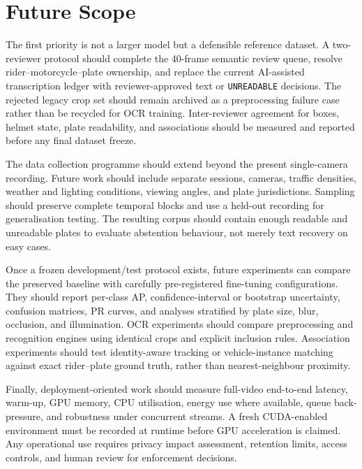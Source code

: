 \documentclass[journal]{IEEEtran}
\begin{document}
\section{Future Scope}
The first priority is not a larger model but a defensible reference dataset. A two-reviewer protocol should complete the 40-frame semantic review queue, resolve rider--motorcycle--plate ownership, and replace the current AI-assisted transcription ledger with reviewer-approved text or \texttt{UNREADABLE} decisions. The rejected legacy crop set should remain archived as a preprocessing failure case rather than be recycled for OCR training. Inter-reviewer agreement for boxes, helmet state, plate readability, and associations should be measured and reported before any final dataset freeze.

The data collection programme should extend beyond the present single-camera recording. Future work should include separate sessions, cameras, traffic densities, weather and lighting conditions, viewing angles, and plate jurisdictions. Sampling should preserve complete temporal blocks and use a held-out recording for generalisation testing. The resulting corpus should contain enough readable and unreadable plates to evaluate abstention behaviour, not merely text recovery on easy cases.

Once a frozen development/test protocol exists, future experiments can compare the preserved baseline with carefully pre-registered fine-tuning configurations. They should report per-class AP, confidence-interval or bootstrap uncertainty, confusion matrices, PR curves, and analyses stratified by plate size, blur, occlusion, and illumination. OCR experiments should compare preprocessing and recognition engines using identical crops and explicit inclusion rules. Association experiments should test identity-aware tracking or vehicle-instance matching against exact rider--plate ground truth, rather than nearest-neighbour proximity.

Finally, deployment-oriented work should measure full-video end-to-end latency, warm-up, GPU memory, CPU utilisation, energy use where available, queue back-pressure, and robustness under concurrent streams. A fresh CUDA-enabled environment must be recorded at runtime before GPU acceleration is claimed. Any operational use requires privacy impact assessment, retention limits, access controls, and human review for enforcement decisions.
\end{document}
